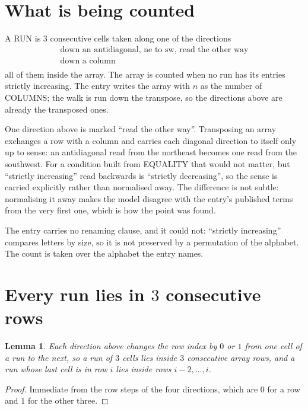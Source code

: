 \documentclass[11pt,a4paper]{article}
\theoremstyle{plain}
\newtheorem{lemma}[theorem]{Lemma}
\theoremstyle{definition}
\begin{document}
\section{What is being counted}

A RUN is $3$ consecutive cells taken along one of the directions
\[
\begin{array}{l}
\text{down an antidiagonal, ne to sw, read the other way} \\
\text{down a column} \\
\end{array}
\]
all of them inside the array. The array is counted when no run has its entries strictly increasing. The entry writes the array with $n$ as the number of COLUMNS; the walk is run down the transpose, so the directions above are already the transposed ones.


One direction above is marked ``read the other way''. Transposing an array exchanges a row with
a column and carries each diagonal direction to itself only up to sense: an antidiagonal read
from the northeast becomes one read from the southwest. For a condition built from EQUALITY
that would not matter, but ``strictly increasing'' read backwards is ``strictly decreasing'',
so the sense is carried explicitly rather than normalised away. The
difference is not subtle: normalising it away makes the model disagree with the entry's
published terms from the very first one, which is how the point was found.

The entry carries no renaming clause, and it could not: ``strictly increasing'' compares
letters by size, so it is not preserved by a permutation of the alphabet. The count is taken
over the alphabet the entry names.

\section{Every run lies in $3$ consecutive rows}

\begin{lemma}\label{lem:win}
Each direction above changes the row index by $0$ or $1$ from one cell of a run to the next, so
a run of $3$ cells lies inside $3$ consecutive array rows, and a run whose last cell is in
row $i$ lies inside rows $i-2,\dots,i$.
\end{lemma}

\begin{proof}
Immediate from the row steps of the four directions, which are $0$ for a row and $1$ for the
other three.
\end{proof}
\end{document}
